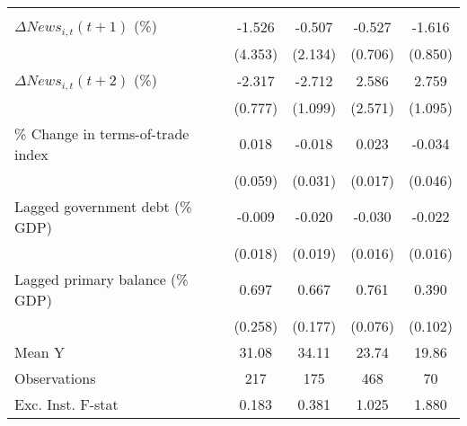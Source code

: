 {\begin{tabular}{l*{4}{c}}
                    &                     &                     &                     &                     \\
\addlinespace
$ \Delta News_{i,t}(t+1)$ (\%)&      -1.526         &      -0.507         &      -0.527         &      -1.616\sym{*}  \\
                    &     (4.353)         &     (2.134)         &     (0.706)         &     (0.850)         \\
\addlinespace
$ \Delta News_{i,t}(t+2)$ (\%)&      -2.317\sym{***}&      -2.712\sym{**} &       2.586         &       2.759\sym{**} \\
                    &     (0.777)         &     (1.099)         &     (2.571)         &     (1.095)         \\
\addlinespace
\% Change in terms-of-trade index&       0.018         &      -0.018         &       0.023         &      -0.034         \\
                    &     (0.059)         &     (0.031)         &     (0.017)         &     (0.046)         \\
\addlinespace
Lagged government debt (\% GDP)&      -0.009         &      -0.020         &      -0.030\sym{*}  &      -0.022         \\
                    &     (0.018)         &     (0.019)         &     (0.016)         &     (0.016)         \\
\addlinespace
Lagged primary balance (\% GDP)&       0.697\sym{***}&       0.667\sym{***}&       0.761\sym{***}&       0.390\sym{***}\\
                    &     (0.258)         &     (0.177)         &     (0.076)         &     (0.102)         \\
\midrule
Mean Y              &       31.08         &       34.11         &       23.74         &       19.86         \\
Observations        &         217         &         175         &         468         &          70         \\
Exc. Inst. F-stat   &       0.183         &       0.381         &       1.025         &       1.880         \\
\bottomrule
\end{tabular}
}
